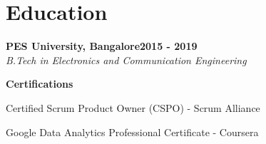 \documentclass[letterpaper,11pt]{article}
\newcommand{\heading}[2]{
  \hspace{10pt}#1\hfill#2\\
}
\newcommand{\headingBf}[2]{
  \heading{\textbf{#1}}{\textbf{#2}}
}
\newcommand{\headingIt}[2]{
  \heading{\textit{#1}}{\textit{#2}}
}
\newenvironment{resume_list}{
  \vspace{-7pt}
  \begin{itemize}[itemsep=-2px, parsep=1pt, leftmargin=30pt]
}{
  \end{itemize}
}
\begin{document}
  \section{Education}
  \headingBf{PES University, Bangalore}{2015 - 2019}
  \headingIt{B.Tech in Electronics and Communication Engineering}{}
  \vspace{6pt}
  \headingBf{Certifications}{}
  \begin{resume_list}
    \item Certified Scrum Product Owner (CSPO) - Scrum Alliance
    \item Google Data Analytics Professional Certificate - Coursera
  \end{resume_list}
\end{document}

